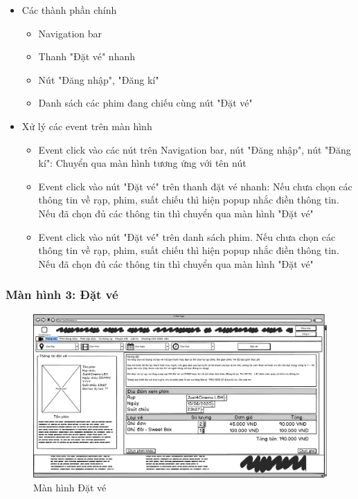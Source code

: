 \documentclass[a4paper, 12pt]{article}
\begin{document}
\begin{itemize}
	\item Các thành phần chính
	\begin{itemize}
		\item Navigation bar
		\item Thanh "Đặt vé" nhanh
		\item Nút "Đăng nhập", "Đăng kí"
		\item Danh sách các phim đang chiếu cùng nút "Đặt vé"
	\end{itemize}

	\item Xử lý các event trên màn hình
	\begin{itemize}
		\item Event click vào các nút trên Navigation bar, nút "Đăng nhập", nút "Đăng kí": Chuyển qua màn hình tương ứng với tên nút
		\item Event click vào nút "Đặt vé" trên thanh đặt vé nhanh: Nếu chưa chọn các thông tin về rạp, phim, suất chiếu thì hiện popup nhắc điền thông tin. Nếu đã chọn đủ các thông tin thì chuyển qua màn hình "Đặt vé"
		\item Event click vào nút "Đặt vé" trên danh sách phim. Nếu chưa chọn các thông tin về rạp, phim, suất chiếu thì hiện popup nhắc điền thông tin. Nếu đã chọn đủ các thông tin thì chuyển qua màn hình "Đặt vé"
	\end{itemize}
\end{itemize}

\subsubsection{Màn hình 3: Đặt vé}

\begin{figure}[H]
	\begin{center}
		\includegraphics[scale = 0.25]{Wireframe/User/Đặt vé.png}
		\caption{Màn hình Đặt vé}
	\end{center}
\end{figure}
\end{document}
